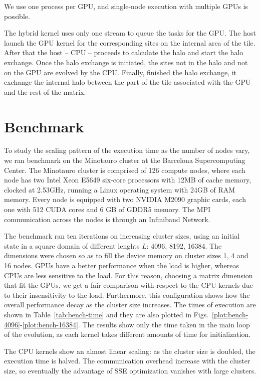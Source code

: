 We use one process per GPU, and single-node execution with multiple GPUs is possible.

The hybrid kernel uses only one stream to queue the tasks for the GPU. The host launch the GPU kernel for the corresponding sites on the internal area of the tile. After that the host -- CPU -- proceeds to calculate the halo and start the halo exchange. Once the halo exchange is initiated, the sites not in the halo and not on the GPU are evolved by the CPU. Finally, finished the halo exchange, it exchange the internal halo between the part of the tile associated with the GPU and the rest of the matrix.

\section{Benchmark}
To study the scaling pattern of the execution time as the number of nodes vary, we ran benchmark on the Minotauro cluster at the Barcelona Supercomputing Center. The Minotauro cluster is comprised of 126 compute nodes, where each node has two Intel Xeon E5649 six-core processors with 12MB of cache memory, clocked at 2.53GHz, running a Linux operating system with 24GB of RAM memory. Every node is equipped with two NVIDIA M2090 graphic cards, each one with 512 CUDA cores and 6 GB of GDDR5 memory. The MPI communication across the nodes is through an Infiniband Network. 

The benchmark ran ten iterations on increasing cluster sizes, using an initial state in a square domain of different lenghts $L$: 4096, 8192, 16384. The dimensions were chosen so as to fill the device memory on cluster sizes 1, 4 and 16 nodes. GPUs have a better performance when the load is higher, whereas CPUs are less sensitive to the load. For this reason, choosing a matrix dimension that fit the GPUs, we get a fair comparison with respect to the CPU kernels due to their insensitivity to the load. Furthermore, this configuration shows how the overall performance decay as the cluster size increases. The times of execution are shown in Table~\ref{tab:bench-time} and they are also plotted in Figs.~\ref{plot:bench-4096}-\ref{plot:bench-16384}.
The results show only the time taken in the main loop of the evolution, as each kernel takes different amounts of time for initialization.

The CPU kernels show an almost linear scaling: as the cluster size is doubled, the execution time is halved. The communication overhead increase with the cluster size, so eventually the advantage of SSE optimization vanishes with large clusters.

